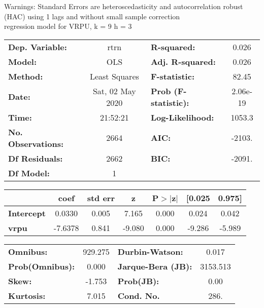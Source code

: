 Warnings: \newline
 [1] Standard Errors are heteroscedasticity and autocorrelation robust (HAC) using 1 lags and without small sample correction\\ 

regression model for VRPU, k = 9 h = 3\begin{center}
\begin{tabular}{lclc}
\toprule
\textbf{Dep. Variable:}    &       rtrn       & \textbf{  R-squared:         } &     0.026   \\
\textbf{Model:}            &       OLS        & \textbf{  Adj. R-squared:    } &     0.026   \\
\textbf{Method:}           &  Least Squares   & \textbf{  F-statistic:       } &     82.45   \\
\textbf{Date:}             & Sat, 02 May 2020 & \textbf{  Prob (F-statistic):} &  2.06e-19   \\
\textbf{Time:}             &     21:52:21     & \textbf{  Log-Likelihood:    } &    1053.3   \\
\textbf{No. Observations:} &        2664      & \textbf{  AIC:               } &    -2103.   \\
\textbf{Df Residuals:}     &        2662      & \textbf{  BIC:               } &    -2091.   \\
\textbf{Df Model:}         &           1      & \textbf{                     } &             \\
\bottomrule
\end{tabular}
\begin{tabular}{lcccccc}
                   & \textbf{coef} & \textbf{std err} & \textbf{z} & \textbf{P$> |$z$|$} & \textbf{[0.025} & \textbf{0.975]}  \\
\midrule
\textbf{Intercept} &       0.0330  &        0.005     &     7.165  &         0.000        &        0.024    &        0.042     \\
\textbf{vrpu}      &      -7.6378  &        0.841     &    -9.080  &         0.000        &       -9.286    &       -5.989     \\
\bottomrule
\end{tabular}
\begin{tabular}{lclc}
\textbf{Omnibus:}       & 929.275 & \textbf{  Durbin-Watson:     } &    0.017  \\
\textbf{Prob(Omnibus):} &   0.000 & \textbf{  Jarque-Bera (JB):  } & 3153.513  \\
\textbf{Skew:}          &  -1.753 & \textbf{  Prob(JB):          } &     0.00  \\
\textbf{Kurtosis:}      &   7.015 & \textbf{  Cond. No.          } &     286.  \\
\bottomrule
\end{tabular}
\end{center}

